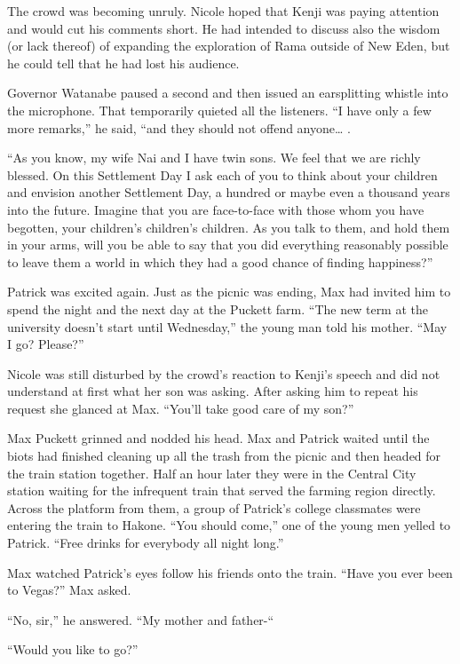 \documentclass[]{article}
\begin{document}
{The crowd was becoming unruly.  Nicole hoped that Kenji was paying attention and would cut his comments short.  He had intended to discuss also the wisdom (or lack thereof) of expanding the exploration of Rama outside of New Eden, but he could tell that he had lost his audience.

Governor Watanabe paused a second and then issued an earsplitting whistle into the microphone.  That temporarily quieted all the listeners.  “I have only a few more remarks,” he said, “and they should not offend anyone… .

“As you know, my wife Nai and I have twin sons.  We feel that we are richly blessed.  On this Settlement Day I ask each of you to think about your children and envision another Settlement Day, a hundred or maybe even a thousand years into the future.  Imagine that you are face-to-face with those whom you have begotten, your children’s children’s children.  As you talk to them, and hold them in your arms, will you be able to say that you did everything reasonably possible to leave them a world in which they had a good chance of finding happiness?”

Patrick was excited again.  Just as the picnic was ending, Max had invited him to spend the night and the next day at the Puckett farm.  “The new term at the university doesn’t start until Wednesday,” the young man told his mother.  “May I go? Please?”

Nicole was still disturbed by the crowd’s reaction to Kenji’s speech and did not understand at first what her son was asking.  After asking him to repeat his request she glanced at Max.  “You’ll take good care of my son?”

Max Puckett grinned and nodded his head.  Max and Patrick waited until the biots had finished cleaning up all the trash from the picnic and then headed for the train station together.  Half an hour later they were in the Central City station waiting for the infrequent train that served the farming region directly.  Across the platform from them, a group of Patrick’s college classmates were entering the train to Hakone.  “You should come,” one of the young men yelled to Patrick.  “Free drinks for everybody all night long.”

Max watched Patrick’s eyes follow his friends onto the train.  “Have you ever been to Vegas?” Max asked.

“No, sir,” he answered.  “My mother and father-“

“Would you like to go?”

}
\end{document}
